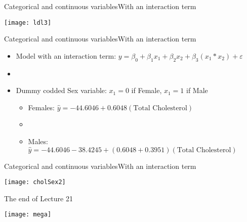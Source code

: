 \documentclass[xcolor=dvipsnames]{beamer}
\begin{document}
\begin{frame}{Categorical and continuous variables}{With an interaction term}
	\begin{center}
		\texttt{[image: ldl3]}
	\end{center}
\end{frame}

\begin{frame}{Categorical and continuous variables}{With an interaction term}
	\begin{itemize}
		\item Model with an interaction term: $y = \beta_0 + \beta_1 x_1 + \beta_2 x_2 + \beta_3 (x_1 * x_2) + \varepsilon $
		\item[]
		\item Dummy codded Sex variable: $x_1 = 0$ if Female, $x_1 = 1$ if Male \pause
		\begin{itemize}
			\item Females: $\hat{y} = -44.6046 + 0.6048 (\text{Total Cholesterol})  $ \pause
			\item[]
			\item Males: $\hat{y} = -44.6046  -38.4245 + (0.6048 + 0.3951)(\text{Total Cholesterol}) $
		\end{itemize}
	\end{itemize}
\end{frame}

\begin{frame}{Categorical and continuous variables}{With an interaction term}
	\begin{center}
		\texttt{[image: cholSex2]}
	\end{center}
\end{frame}

\begin{frame}{The end of Lecture 21}
	\begin{center}
		\texttt{[image: mega]}
	\end{center}
\end{frame}
\end{document}
